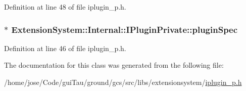 Definition at line 48 of file iplugin\-\_\-p.\-h.

\hypertarget{class_extension_system_1_1_internal_1_1_i_plugin_private_a377dc83eb6f39dfa7a57a0530c064d57}{
\subsubsection[{plugin\-Spec}]{$\ast$ Extension\-System\-::\-Internal\-::\-I\-Plugin\-Private\-::plugin\-Spec}}\label{class_extension_system_1_1_internal_1_1_i_plugin_private_a377dc83eb6f39dfa7a57a0530c064d57}


Definition at line 46 of file iplugin\-\_\-p.\-h.



The documentation for this class was generated from the following file\-:\begin{DoxyCompactItemize}
\item 
/home/jose/\-Code/gui\-Tau/ground/gcs/src/libs/extensionsystem/\hyperlink{iplugin__p_8h}{iplugin\-\_\-p.\-h}\end{DoxyCompactItemize}
